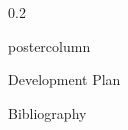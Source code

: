\documentclass[final,hyperref={pdfpagelabels=false}]{beamer}
\def\colwidth{0.2\linewidth}
\begin{document}
\begin{frame}[fragile]
\begin{columns}[T]
\begin{column}{\colwidth}
\begin{beamercolorbox}[center,wd=\textwidth]{postercolumn}
\begin{minipage}[T]{.98\textwidth}
{\begin{block}{Development Plan}
						\end{block}
						
						
						
						
						\begin{block}{Bibliography}
							
							\printbibliography[title=References]%
						\end{block}
					}
				\end{minipage}
			\end{beamercolorbox}
		\end{column}
		
	\end{columns}
\end{frame}
\end{document}

